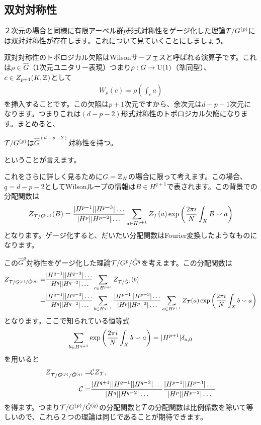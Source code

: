 \documentclass[generalized_symmetry.tex]{subfiles}
\begin{document}
\subsection{双対対称性}
２次元の場合と同様に有限アーベル群$p$形式対称性をゲージ化した理論$\mathcal{T}/G^{(p)}$には双対対称性が存在します。これについて見ていくことにしましょう。

双対対称性のトポロジカル欠陥はWilsonサーフェスと呼ばれる演算子です。これは$\rho\in \hat{G}$（1次元ユニタリー表現）つまり$\rho:G\to \mbox{U}(1)$（準同型）、$c \in Z_{p+1}(K,\mathbb{Z})$として
\begin{align}
  W_{\rho}(c) = \rho\left(\int_{c} a\right)
\end{align}
を挿入することです。この欠陥は$p+1$次元ですから、余次元は$d-p-1$次元になります。つまりこれは$(d-p-2)$形式対称性のトポロジカル欠陥になります。まとめると、
\begin{emphasize}
  $\mathcal{T}/G^{(p)}$は$\hat{G}^{(d-p-2)}$対称性を持つ。
\end{emphasize}
ということが言えます。

これをさらに詳しく見るために$G=\mathbb{Z}_N$の場合に限って考えます。この場合、$q=d-p-2$としてWilsonループの情報は$B \in H^{q+1}$で表されます。この背景での分配関数は
\begin{align}
  Z_{\mathcal{T}/G^{(p)}}(B) = \frac{|H^{p-1}||H^{p-3}|\dots }{|H^p||H^{p-2}|\dots } \sum_{a \in H^{p+1}} Z_{\mathcal{T}}(a) \exp\left(\frac{2\pi i}{N}\int_{X} B\smallsmile a\right)
\end{align}
となります。ゲージ化すると、だいたい分配関数はFourier変換したようなものになります。

この$\hat{G}^{q}$対称性をゲージ化した理論$\mathcal{T}/G^{p}/\hat{G}^q$を考えます。この分配関数は
\begin{align}
  Z_{\mathcal{T}/G^{(p)}/\hat{G}^{(q)}} =& \frac{|H^{q-1}||H^{q-3}|\dots }{|H^q||H^{q-2}|\dots } \sum_{c \in H^{p+1}} Z_{\mathcal{T}/\hat{G}^{q}}(b)\notag\\
  =&\frac{|H^{q-1}||H^{q-3}|\dots }{|H^q||H^{q-2}|\dots } \sum_{b \in H^{q+1}} \frac{|H^{p-1}||H^{p-3}|\dots }{|H^p||H^{p-2}|\dots } \sum_{a \in H^{p+1}} Z_{\mathcal{T}}(a) \exp\left(\frac{2\pi i}{N}\int_{X} b\smallsmile a\right)
\end{align}
となります。ここで知られている恒等式
\begin{align}
  \sum_{b \in H^{q+1}}\exp\left(\frac{2\pi i}{N}\int_{X} b\smallsmile a\right)=
  |H^{p+1}|\delta_{a,0}
  \label{completenessidentity}
\end{align}
を用いると
\begin{align}
  Z_{\mathcal{T}/G^{(p)}/\hat{G}^{(q)}} =& \mathcal{C} Z_{\mathcal{T}},\\
  \mathcal{C}=&
  \frac{|H^{q+1}||H^{q-1}||H^{q-3}|\dots }{|H^q||H^{q-2}|\dots }\frac{|H^{p-1}||H^{p-3}|\dots }{|H^p||H^{p-2}|\dots } 
\end{align}
を得ます。つまり$\mathcal{T}/G^{(p)}/\hat{G}^{(q)}$の分配関数と$\mathcal{T}$の分配関数は比例係数を除いて等しいので、これら２つの理論は同じであることが期待できます。
\end{document}
